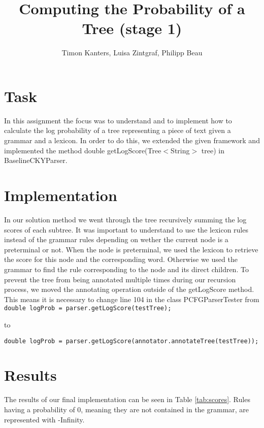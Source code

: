 \documentclass{article}
\begin{document}
\title{Computing the Probability of a Tree (stage 1)}
\author{Timon Kanters, Luisa Zintgraf, Philipp Beau}
\maketitle

\section{Task}

In this assignment the focus was to understand and to implement how to calculate the log probability of a tree representing a piece of text given a grammar and a lexicon. In order to do this, we extended the given framework and implemented the method double getLogScore(Tree$<$String$>$ tree) in BaselineCKYParser.

\section{Implementation}

In our solution method we went through the tree recursively summing the log scores of each subtree. It was important to understand to use the lexicon rules instead of the grammar rules depending on wether the current node is a preterminal or not.
When the node is preterminal, we used the lexicon to retrieve the score for this node and the corresponding word. Otherwise we used the grammar to find the rule corresponding to the node and its direct children.
To prevent the tree from being annotated multiple times during our recursion process, we moved the annotating operation outside of the getLogScore method. This means it is necessary to change line 104 in the class PCFGParserTester from \\

\texttt{double logProb = parser.getLogScore(testTree);}

to

\texttt{double logProb = parser.getLogScore(annotator.annotateTree(testTree));}

\section{Results}

The results of our final implementation can be seen in Table \ref{tab:scores}. Rules having a probability of 0, meaning they are not contained in the grammar, are represented with -Infinity.
\end{document}
